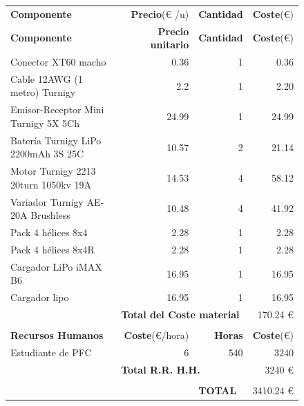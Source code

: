 \documentclass[twoside,11pt]{book}
\begin{document}
\begin{figure}[h!]
\hspace{-0.2cm}
\begin{tabular}{|l|r|r|r|}
\hline

\hspace{2cm}\textbf{Componente} & \textbf{Precio}(€ /u) & \textbf{Cantidad} & \textbf{Coste}(€) \\
\textbf{Componente} & \textbf{Precio unitario} & \textbf{Cantidad} & \textbf{Coste}(€) \\

\hline
\hline
Conector XT60 macho & 0.36 & 1 & 0.36 \\
Cable 12AWG (1 metro) Turnigy & 2.2 & 1 & 2.20 \\
Emisor-Receptor Mini Turnigy 5X 5Ch & 24.99 & 1 & 24.99 \\
Batería Turnigy LiPo 2200mAh 3S 25C & 10.57 & 2 & 21.14 \\
Motor Turnigy 2213 20turn 1050kv 19A & 14.53 & 4 & 58.12 \\
Variador Turnigy AE-20A Brushless & 10.48 & 4 & 41.92 \\
Pack 4 hélices 8x4 & 2.28 & 1 & 2.28 \\
Pack 4 hélices 8x4R & 2.28 & 1 & 2.28 \\ 

Cargador LiPo iMAX B6 & 16.95 & 1 & 16.95 \\
\hline \cmidrule{2-4}

Cargador lipo & 16.95 & 1 & 16.95 \\
\hline \cmidrule{3-4}

\multicolumn{1}{r}{} & \multicolumn{2}{|l|}{\textbf{Total del Coste material}} & 170.24 €\\ \cmidrule{2-4}
\multicolumn{4}{r}{} \\
\hline
\hspace{1.5cm}\textbf{Recursos Humanos} & \textbf{Coste}(€/hora) & \textbf{Horas} & \textbf{Coste}(€) \\
\hline
\hline
Estudiante de PFC & 6 & 540 & 3240 \\
\hline \cmidrule{2-4}
\multicolumn{1}{r}{} & \multicolumn{2}{|l|}{\textbf{Total R.R. H.H.}} & 3240 €\\ \cmidrule{2-4}
\multicolumn{4}{r}{} \\
\cmidrule{3-4}
\multicolumn{2}{r}{} & \multicolumn{1}{|l|}{\textbf{TOTAL}} & 3410.24 €\\ \cmidrule{3-4}
\end{tabular} 
\end{figure}
\newpage
\end{document}
